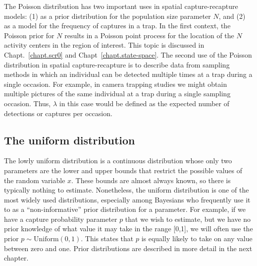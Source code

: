 The Poisson distribution has two important uses in spatial
capture-recapture models: (1) as a prior distribution for the
population size parameter $N$, and (2) as a model for the frequency of
captures in a trap. In the first context, the Poisson prior for $N$
results in a Poisson point process for the location of the $N$
activity centers in the region of interest. This topic is discussed
in Chapt.~\ref{chapt.scr0} and Chapt~\ref{chapt.state-space}.
The second use of the Poisson distribution in spatial capture-recapture is
to describe data from sampling methods in which an
individual can be detected multiple times at a trap during a single
occasion. For example, in camera trapping studies we might obtain
multiple pictures of the same individual at a trap during a single sampling
occasion. Thus, $\lambda$ in this case would be defined as the
expected number of detections or captures per occasion.


\subsection{The uniform distribution}

The lowly uniform distribution is a continuous distribution whose
only two parameters are the lower and upper bounds that restrict the
possible values of the random variable $x$. These bounds
are almost always known, so there is typically nothing to
estimate. Nonetheless, the uniform
distribution is one of the most widely used distributions,
especially among Bayesians who frequently use it to as a ``non-informative''
prior distribution for a parameter. For example, if we
have a capture probability parameter $p$ that we wish to estimate, but
we have no prior knowledge of what value it may take in the range
[0,1], we will often use the prior $p \sim \text{Uniform}(0,1)$. This
states that $p$ is equally likely to take on any value between
zero and one. Prior distributions are described in more detail in the
next chapter.

